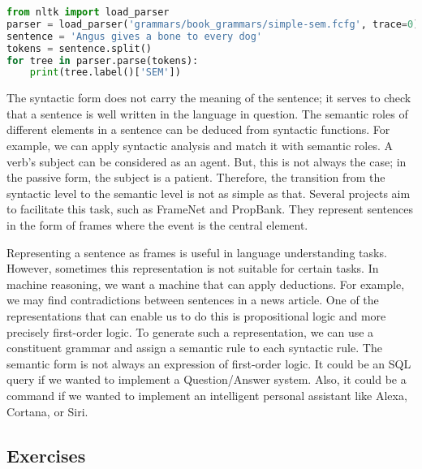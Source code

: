 \documentclass{KBook}
\begin{document}
\begin{lstlisting}[language=Python, style=codeStyle]
from nltk import load_parser
parser = load_parser('grammars/book_grammars/simple-sem.fcfg', trace=0)
sentence = 'Angus gives a bone to every dog'
tokens = sentence.split()
for tree in parser.parse(tokens):
    print(tree.label()['SEM'])
\end{lstlisting}



The syntactic form does not carry the meaning of the sentence; it serves to check that a sentence is well written in the language in question. The semantic roles of different elements in a sentence can be deduced from syntactic functions. For example, we can apply syntactic analysis and match it with semantic roles. A verb's subject can be considered as an agent. But, this is not always the case; in the passive form, the subject is a patient. Therefore, the transition from the syntactic level to the semantic level is not as simple as that. Several projects aim to facilitate this task, such as FrameNet and PropBank. They represent sentences in the form of frames where the event is the central element.

Representing a sentence as frames is useful in language understanding tasks. However, sometimes this representation is not suitable for certain tasks. In machine reasoning, we want a machine that can apply deductions. For example, we may find contradictions between sentences in a news article. One of the representations that can enable us to do this is propositional logic and more precisely first-order logic. To generate such a representation, we can use a constituent grammar and assign a semantic rule to each syntactic rule. The semantic form is not always an expression of first-order logic. It could be an SQL query if we wanted to implement a Question/Answer system. Also, it could be a command if we wanted to implement an intelligent personal assistant like Alexa, Cortana, or Siri.



\subsection*{Exercises}
\end{document}
